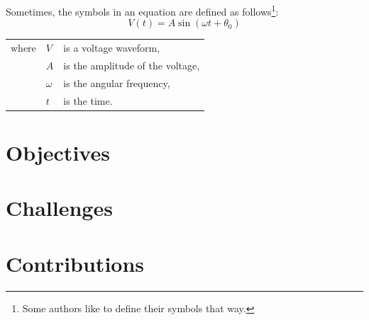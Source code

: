 Sometimes, the symbols in an equation are defined as follows\footnote{Some authors like to define their symbols that way.}:
\begin{equation}
	V(t)=A \sin(\omega t+\theta_0)
\end{equation}

\begin{tabular}{lll}
	where & $V$ & is a voltage waveform,\\
	& $A$ & is the amplitude of the voltage,\\
	& $\omega$ & is the angular frequency,\\
	& $t$ & is the time.
\end{tabular}

\section{Objectives}
\section{Challenges}
\section{Contributions}